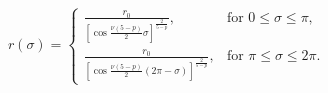 \begin{equation}
r(\sigma) = \left\{ \begin{array}{rl} 
\frac{r_0}{\left[\cos\frac{\nu(5-p)}{2}\sigma\right]^{\frac{2}{5-p}}},&
\mbox{for $0\le \sigma \le \pi$,}\\
\frac{r_0}{\left[\cos\frac{\nu(5-p)}{2}(2\pi-\sigma)\right]
^{\frac{2}{5-p}}},& \mbox{for $\pi\le \sigma \le 2\pi$.}
\end{array} \right.
\end{equation}

